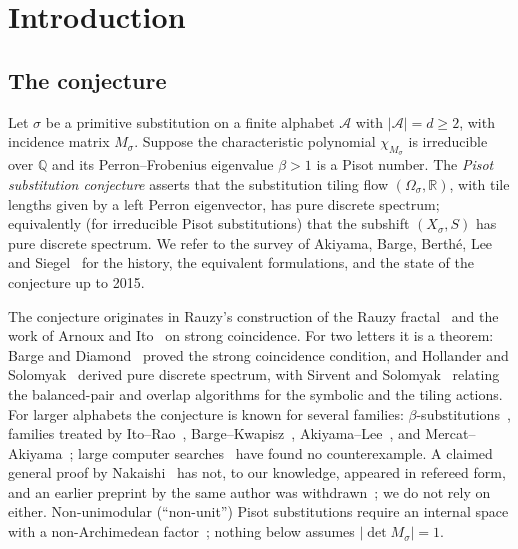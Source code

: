 \documentclass[11pt]{amsart}
\theoremstyle{plain}
\theoremstyle{definition}
\theoremstyle{remark}
\newcommand{\Q}{\mathbb{Q}}
\newcommand{\R}{\mathbb{R}}
\newcommand{\A}{\mathcal{A}}
\newcommand{\PDS}{pure discrete spectrum}
\begin{document}
\begin{abstract}
computer-assisted certificates that cover infinite parameter families. Exhaustive exact computations on all $4{,}554$ primitive irreducible Pisot substitutions on three letters with image lengths at most three are reported as finite evidence with their exact hypotheses. The Pisot substitution conjecture remains open; G1 and G1b-2 remain open; no finite computation reported here is a finiteness theorem.
\end{abstract}

\maketitle
\tableofcontents

\section{Introduction}\label{sec:intro}

\subsection{The conjecture}
Let $\sigma$ be a primitive substitution on a finite alphabet $\A$ with $|\A|=d\ge 2$, with incidence matrix $M_\sigma$. Suppose the characteristic polynomial $\chi_{M_\sigma}$ is irreducible over $\Q$ and its Perron--Frobenius eigenvalue $\beta>1$ is a Pisot number. The \emph{Pisot substitution conjecture} asserts that the substitution tiling flow $(\Omega_\sigma,\R)$, with tile lengths given by a left Perron eigenvector, has \PDS; equivalently (for irreducible Pisot substitutions) that the subshift $(X_\sigma,S)$ has \PDS{}. We refer to the survey of Akiyama, Barge, Berth\'e, Lee and Siegel~\cite{ABBLS} for the history, the equivalent formulations, and the state of the conjecture up to 2015.

The conjecture originates in Rauzy's construction of the Rauzy fractal~\cite{Rauzy} and the work of Arnoux and Ito~\cite{AI} on strong coincidence. For two letters it is a theorem: Barge and Diamond~\cite{BD} proved the strong coincidence condition, and Hollander and Solomyak~\cite{HS} derived \PDS{}, with Sirvent and Solomyak~\cite{SS} relating the balanced-pair and overlap algorithms for the symbolic and the tiling actions. For larger alphabets the conjecture is known for several families: $\beta$-substitutions~\cite{Barge2018}, families treated by Ito--Rao~\cite{IR}, Barge--Kwapisz~\cite{BK}, Akiyama--Lee~\cite{AL}, and Mercat--Akiyama~\cite{MA}; large computer searches~\cite{BalchinRust} have found no counterexample. A claimed general proof by Nakaishi~\cite{Nakaishi2024} has not, to our knowledge, appeared in refereed form, and an earlier preprint by the same author was withdrawn~\cite{Nakaishi2016}; we do not rely on either. Non-unimodular (``non-unit'') Pisot substitutions require an internal space with a non-Archimedean factor~\cite{MT,BBK}; nothing below assumes $|\det M_\sigma|=1$.
\end{document}
